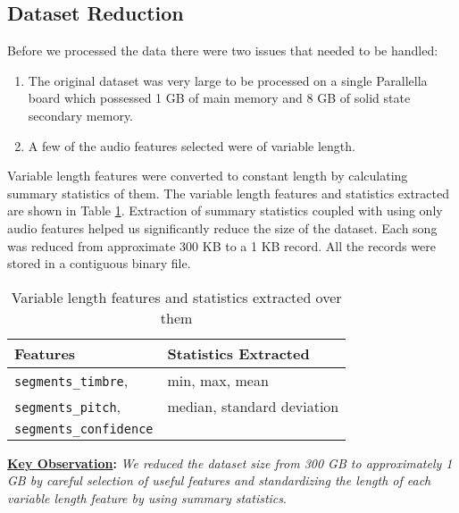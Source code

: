 \subsection{Dataset Reduction}
\label{subsec: meth_dataset_reduc}
Before we processed the data there were two issues that needed to be handled:
\begin{enumerate}
\item The original dataset was very large to be processed on a single Parallella board which possessed 1 GB of main memory and 8 GB of solid state secondary memory.
\item A few of the audio features selected were of variable length.
\end{enumerate}
Variable length features were converted to constant length by calculating summary statistics of them. The variable length features and statistics extracted are shown in Table \ref{table:varLenFeature_stats}. Extraction of summary statistics coupled with using only audio features helped us significantly reduce the size of the dataset. Each song was reduced from approximate 300 KB to a 1 KB record. All the records were stored in a contiguous binary file.
\begin{table}
\begin{center}
\begin{tabular}{| l | l |}
\hline
\textbf{Features} & Statistics Extracted \\
\hline
\texttt{segments\_timbre}, & min, max, mean\\
\texttt{segments\_pitch}, & median, standard deviation\\
\texttt{segments\_confidence} & \\
\hline
\end{tabular}
\caption{Variable length features and statistics extracted over them}
\label{table:varLenFeature_stats}
\end{center}
\end{table}

\textbf{\underline{Key Observation}: } \textit{We reduced the dataset size from 300 GB to approximately 1 GB by careful selection of useful features and standardizing the length of each variable length feature by using summary statistics}.